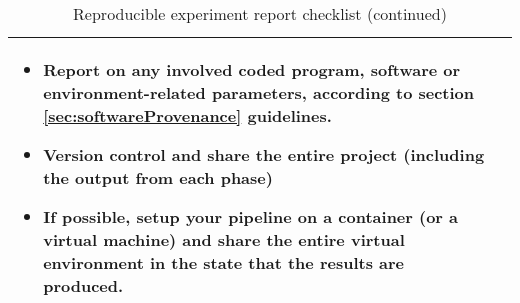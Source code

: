 \begin{table}[ht]
\begin{tabular}{| P{14cm} || p{2cm} |}
\begin{itemize}
                \item
                {\small Report on any involved coded program, software or environment-related parameters, 
                  according to section \ref{sec:softwareProvenance} guidelines. }
                
                \item
                {\small Version control and share the entire project (including the output from each phase)}
                \item
                
                {\small If possible, setup your pipeline on a container (or a virtual machine) and share the entire virtual environment in 
                the state that the results are produced.}
                
            
            \end{itemize} &\\
        \hline

    \end{tabular}
    \captionsetup{font=small,width=12cm}
    \caption{Reproducible experiment report checklist (continued)}
    \label{tab:table3}
    
\end{table}